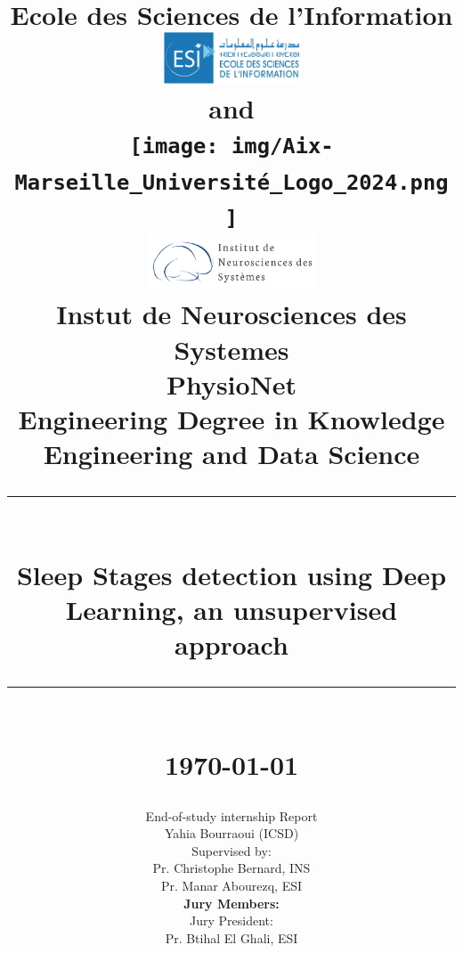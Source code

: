 \documentclass[a4paper,12pt,twoside]{article}
\newcommand{\HRule}[1]{\rule{\linewidth}{#1}}
\begin{document}
\date{}

\title{ \normalsize Ecole des Sciences de l'Information
		\\ [0.3cm]
		\includegraphics[width=40mm]{img/esi-logo-v.jpg}  \\[.3cm]
		and   \\[.3cm]
		\texttt{[image: img/Aix-Marseille\_Université\_Logo\_2024.png ]}\\[.3cm] 
        \includegraphics[width=50mm]{img/ins-300x100.png} \\[.3cm]
		\normalsize Instut de Neurosciences des Systemes \\ [0.3cm]
		PhysioNet\\
            \small Engineering Degree in Knowledge Engineering and Data Science\\
		\HRule{2pt} \\
		\LARGE \textbf{Sleep Stages detection using Deep Learning, an unsupervised approach}
		\HRule{2pt} \\ [0.3cm]
		\normalsize \today}
		
\date{}

\author{
        End-of-study internship Report \\[0.5cm]
		Yahia Bourraoui (ICSD)            \\[.5cm]
		 Supervised by:        \\
		 Pr. Christophe Bernard, INS \\
		 Pr. Manar Abourezq, ESI \\[.5cm]
         \textbf{Jury Members:} \\[0.5cm]
         Jury President: \\
         Pr. Btihal El Ghali, ESI
		 }
		 
\maketitle

\thispagestyle{empty} %
\setcounter{page}{0} %
\clearpage
\end{document}
